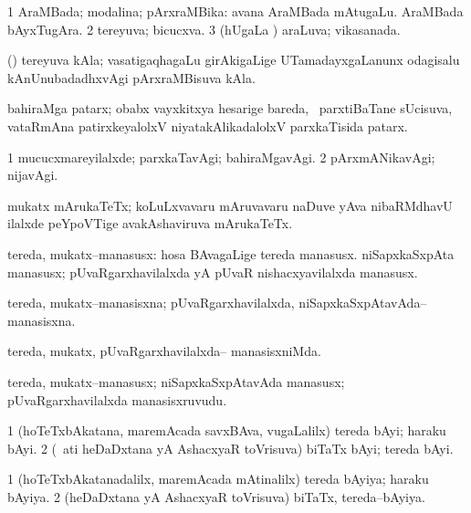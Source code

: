 \bentry
{}
\gl{\gu}
\bmng
\bnum
\num{1} AraMBada; modalina; pArxraMBika:  avana AraMBada mAtugaLu.  AraMBada bAyxTugAra. 
\num{2} tereyuva; bicucxva. 
\num{3} (hUgaLa \vi) araLuva; vikasanada. 
\enum
\emng
\eentry

\bentry
{}
\gl{\nA}
\bmng
(\birx) tereyuva kAla; vasatigaqhagaLu girAkigaLige UTamadayxgaLanunx odagisalu kAnUnubadadhxvAgi pArxraMBisuva kAla. 
\emng
\eentry

\bentry
{}
\gl{\nA}
\bmng
bahiraMga patarx; obabx vayxkitxya hesarige bareda, \kanmu\ parxtiBaTane sUcisuva, vataRmAna patirxkeyalolxV niyatakAlikadalolxV parxkaTisida patarx. 
\emng
\eentry

\bentry
{}
\gl{\kirxvi}
\bmng
\bnum
\num{1} mucucxmareyilalxde; parxkaTavAgi; bahiraMgavAgi. 
\num{2} pArxmANikavAgi; nijavAgi. 
\enum
\emng
\eentry

\bentry
{}
\gl{\nA}
\bmng
mukatx mArukaTeTx; koLuLxvavaru mAruvavaru naDuve yAva nibaRMdhavU ilalxde peYpoVTige avakAshaviruva mArukaTeTx. 
\emng
\eentry

\bentry
{}
\gl{\nA}
\bmng
tereda, mukatx--manasusx: 
\banum
{} hosa BAvagaLige tereda manasusx. 
 niSapxkaSxpAta manasusx; pUvaRgarxhavilalxda yA pUvaR nishacxyavilalxda manasusx. 
\eanum
\emng
\eentry

\bentry
{}
\gl{\gu}
\bmng
tereda, mukatx--manasisxna; pUvaRgarxhavilalxda, niSapxkaSxpAtavAda--manasisxna. 
\emng
\eentry

\bentry
{}
\gl{\kirxvi}
\bmng
tereda, mukatx, pUvaRgarxhavilalxda-- manasisxniMda. 
\emng
\eentry

\bentry
{}
\gl{\nA}
\bmng
tereda, mukatx--manasusx; niSapxkaSxpAtavAda manasusx; pUvaRgarxhavilalxda manasisxruvudu. 
\emng
\eentry

\bentry
{}
\gl{\nA}
\bmng
\bnum
\num{1} (hoTeTxbAkatana, maremAcada savxBAva, \mo vugaLalilx) tereda bAyi; haraku bAyi. 
\num{2} (\kanmu\ ati heDaDxtana yA AshacxyaR toVrisuva) biTaTx bAyi; tereda bAyi. 
\enum
\emng
\eentry

\bentry
{}
\gl{\gu}
\bmng
\bnum
\num{1} (hoTeTxbAkatanadalilx, maremAcada mAtinalilx) tereda bAyiya; haraku bAyiya. 
\num{2} (heDaDxtana yA AshacxyaR toVrisuva) biTaTx, tereda--bAyiya. 
\enum
\emng
\eentry

